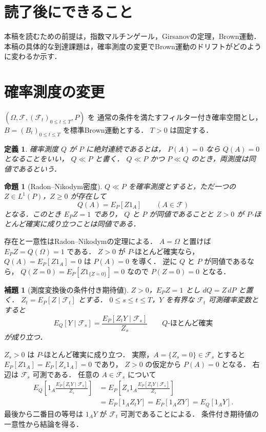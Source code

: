 \documentclass[a5paper,10pt,onecolumn]{jsarticle}
\makeatletter
\theoremstyle{mathnotetheorem}
\newtheorem{definition}[theorem]{定義}
\newtheorem{lemma}[theorem]{補題}
\newtheorem{proposition}[theorem]{命題}
\renewcommand{\proofname}{証明}
\renewenvironment{proof}[1][\proofname]{%
  \par\pushQED{\qed}\normalfont\topsep4\p@\@plus2\p@\relax
  \trivlist\item[\hskip\labelsep\bfseries #1]\ignorespaces
}{\popQED\endtrivlist\@endpefalse}
\makeatother
\begin{document}
\section*{読了後にできること}
本稿を読むための前提は，指数マルチンゲール，Girsanovの定理，Brown運動．
本稿の具体的な到達課題は，確率測度の変更でBrown運動のドリフトがどのように変わるか示す．

\section{確率測度の変更}

$(\Omega,\mathcal F,(\mathcal F_t)_{0\le t\le T},P)$ を
通常の条件を満たすフィルター付き確率空間とし，
$B=(B_t)_{0\le t\le T}$ を標準Brown運動とする．
$T>0$ は固定する．

\begin{definition}
確率測度 $Q$ が $P$ に\emph{絶対連続}であるとは，
$P(A)=0$ なら $Q(A)=0$ となることをいい，
$Q\ll P$ と書く．
$Q\ll P$ かつ $P\ll Q$ のとき，両測度は同値であるという．
\end{definition}

\begin{proposition}[Radon--Nikodym密度]\label{prop:rn}
$Q\ll P$ を確率測度とすると，ただ一つの
$Z\in L^1(P)$，$Z\ge0$ が存在して
\[
 Q(A)=E_P[Z1_A]\qquad(A\in\mathcal F)
\]
となる．このとき $E_PZ=1$ であり，
$Q$ と $P$ が同値であることと $Z>0$ が
$P$-ほとんど確実に成り立つことは同値である．
\end{proposition}
\begin{proof}
存在と一意性はRadon--Nikodymの定理による．
$A=\Omega$ と置けば $E_PZ=Q(\Omega)=1$ である．
$Z>0$ が $P$-ほとんど確実なら，
$Q(A)=E_P[Z1_A]=0$ は $P(A)=0$ を導く．
逆に $Q$ と $P$ が同値であるなら，
$Q(Z=0)=E_P[Z1_{\{Z=0\}}]=0$ なので
$P(Z=0)=0$ となる．
\end{proof}

\begin{lemma}[測度変換後の条件付き期待値]\label{lem:bayes}
$Z>0$，$E_PZ=1$ とし $dQ=Z\,dP$ と置く．
$Z_t=E_P[Z\mid\mathcal F_t]$ とする．
$0\le s\le t\le T$，$Y$ を有界な
$\mathcal F_t$ 可測確率変数とすると
\[
 E_Q[Y\mid\mathcal F_s]
 =\frac{E_P[Z_tY\mid\mathcal F_s]}{Z_s}
 \qquad Q\text{-ほとんど確実}
\]
が成り立つ．
\end{lemma}
\begin{proof}
$Z_s>0$ は $P$-ほとんど確実に成り立つ．
実際，$A=\{Z_s=0\}\in\mathcal F_s$ とすると
$E_P[Z1_A]=E_P[Z_s1_A]=0$ であり，
$Z>0$ の仮定から $P(A)=0$ となる．
右辺は $\mathcal F_s$ 可測である．
任意の $A\in\mathcal F_s$ について
\begin{align*}
 E_Q\left[1_A
 \frac{E_P[Z_tY\mid\mathcal F_s]}{Z_s}\right]
 &=E_P\left[Z_s1_A
 \frac{E_P[Z_tY\mid\mathcal F_s]}{Z_s}\right]\\
 &=E_P[1_AZ_tY]
 =E_P[1_AZY]=E_Q[1_AY].
\end{align*}
最後から二番目の等号は
$1_AY$ が $\mathcal F_t$ 可測であることによる．
条件付き期待値の一意性から結論を得る．
\end{proof}
\end{document}

